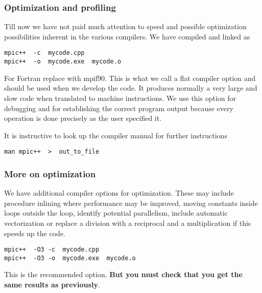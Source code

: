 \documentclass{beamer}
\begin{document}
\begin{frame}
\frametitle{Optimization and profiling}

\begin{block}{}


Till now we have not paid much attention to speed and possible optimization possibilities
inherent in the various compilers. We have compiled and linked as
\begin{verbatim}
mpic++  -c  mycode.cpp
mpic++  -o  mycode.exe  mycode.o
\end{verbatim}
For Fortran replace with mpif90.
This is what we call a flat compiler option and should be used when we develop the code.
It produces normally a very large and slow code when translated to machine instructions.
We use this option for debugging and for establishing the correct program output because
every operation is done precisely as the user specified it.

It is instructive to look up the compiler manual for further instructions
\begin{verbatim}
man mpic++  >  out_to_file
\end{verbatim}


\end{block}
\end{frame}

\begin{frame}
\frametitle{More on optimization}

\begin{block}{}
We have additional compiler options for optimization. These may include procedure inlining where 
performance may be improved, moving constants inside loops outside the loop, 
identify potential parallelism, include automatic vectorization or replace a division with a reciprocal
and a multiplication if this speeds up the code.
\begin{verbatim}
mpic++  -O3 -c  mycode.cpp
mpic++  -O3 -o  mycode.exe  mycode.o
\end{verbatim}
This is the recommended option. \textbf{But you must check that you get the same results as previously}.


\end{block}
\end{frame}
\end{document}
